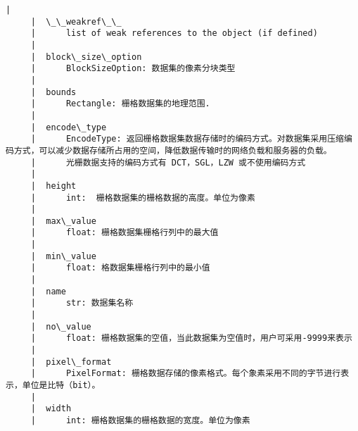 \documentclass[11pt]{article}
\begin{document}
\begin{Verbatim}[commandchars=\\\{\}]
     |  
     |  \_\_weakref\_\_
     |      list of weak references to the object (if defined)
     |  
     |  block\_size\_option
     |      BlockSizeOption: 数据集的像素分块类型
     |  
     |  bounds
     |      Rectangle: 栅格数据集的地理范围.
     |  
     |  encode\_type
     |      EncodeType: 返回栅格数据集数据存储时的编码方式。对数据集采用压缩编码方式，可以减少数据存储所占用的空间，降低数据传输时的网络负载和服务器的负载。
     |      光栅数据支持的编码方式有 DCT，SGL，LZW 或不使用编码方式
     |  
     |  height
     |      int:  栅格数据集的栅格数据的高度。单位为像素
     |  
     |  max\_value
     |      float: 栅格数据集栅格行列中的最大值
     |  
     |  min\_value
     |      float: 格数据集栅格行列中的最小值
     |  
     |  name
     |      str: 数据集名称
     |  
     |  no\_value
     |      float: 栅格数据集的空值，当此数据集为空值时，用户可采用-9999来表示
     |  
     |  pixel\_format
     |      PixelFormat: 栅格数据存储的像素格式。每个象素采用不同的字节进行表示，单位是比特（bit）。
     |  
     |  width
     |      int: 栅格数据集的栅格数据的宽度。单位为像素
    

\end{Verbatim}
\end{document}
